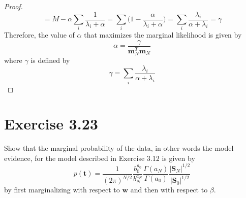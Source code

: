 \begin{proof}
\[        = M - \alpha \sum_i \frac{1}{\lambda_i + \alpha}
        = \sum_i \bigg(1 - \frac{\alpha}{\lambda_i + \alpha}\bigg)
        = \sum_i \frac{\lambda_i}{\alpha + \lambda_i}
        = \gamma
    \] 
    Therefore, the value of $\alpha$ that maximizes the marginal likelihood
    is given by 
    \begin{equation}\label{eq:3.92}\tag{3.92}
        \alpha = \frac{\gamma}{\mathbf{m}_N^T\mathbf{m}_N}
    \end{equation}
    where $\gamma$ is defined by
    \begin{equation}\label{eq:3.91}\tag{3.91}
        \gamma = \sum_i \frac{\lambda_i}{\alpha + \lambda_i}
    \end{equation}
\end{proof}

\section*{Exercise 3.23}
Show that the marginal probability of the data, in other words the model
evidence, for the model described in Exercise 3.12 is given by
\begin{equation}\label{eq:3.118}\tag{3.118}
    p(\mathbf{t}) = \frac{1}{(2\pi)^{N / 2}} \frac{b_0^{a_0}}{b_N^{a_N}}
    \frac{\Gamma(a_N)}{\Gamma(a_0)} \frac{|\mathbf{S}_N|^{1/2}}{|\mathbf{S}_0|^{1/2}}
\end{equation}
by first marginalizing with respect to $\mathbf{w}$ and then with
respect to $\beta$.

\vspace{1em}

